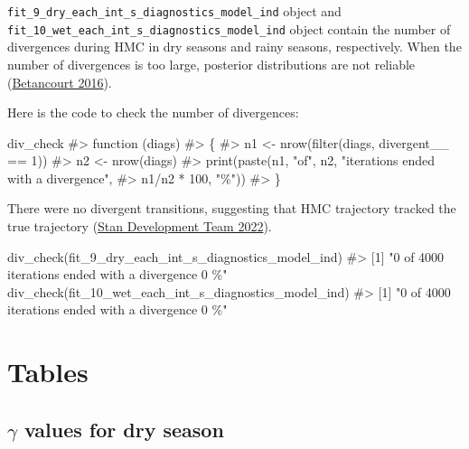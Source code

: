 \documentclass[
  11pt,
  letterpaper,
  DIV=11,
  numbers=noendperiod]{scrartcl}
\newenvironment{Shaded}{}{}
\newcommand{\CommentTok}[1]{\textcolor[rgb]{0.42,0.45,0.49}{#1}}
\newcommand{\FunctionTok}[1]{\textcolor[rgb]{0.44,0.26,0.76}{#1}}
\newcommand{\NormalTok}[1]{\textcolor[rgb]{0.14,0.16,0.18}{#1}}
\begin{document}
\texttt{fit\_9\_dry\_each\_int\_s\_diagnostics\_model\_ind} object and
\texttt{fit\_10\_wet\_each\_int\_s\_diagnostics\_model\_ind} object
contain the number of divergences during HMC in dry seasons and rainy
seasons, respectively. When the number of divergences is too large,
posterior distributions are not reliable
(\protect\hyperlink{ref-Betancourt2016}{Betancourt 2016}).

Here is the code to check the number of divergences:

\begin{Shaded}
\begin{Highlighting}[]
\NormalTok{div\_check}
\CommentTok{\#\textgreater{} function (diags) }
\CommentTok{\#\textgreater{} \{}
\CommentTok{\#\textgreater{}     n1 \textless{}{-} nrow(filter(diags, divergent\_\_ == 1))}
\CommentTok{\#\textgreater{}     n2 \textless{}{-} nrow(diags)}
\CommentTok{\#\textgreater{}     print(paste(n1, "of", n2, "iterations ended with a divergence", }
\CommentTok{\#\textgreater{}         n1/n2 * 100, "\%"))}
\CommentTok{\#\textgreater{} \}}
\end{Highlighting}
\end{Shaded}

There were no divergent transitions, suggesting that HMC trajectory
tracked the true trajectory
(\protect\hyperlink{ref-StanDevelopmentTeam2022}{Stan Development Team
2022}).

\begin{Shaded}
\begin{Highlighting}[]
\FunctionTok{div\_check}\NormalTok{(fit\_9\_dry\_each\_int\_s\_diagnostics\_model\_ind)}
\CommentTok{\#\textgreater{} [1] "0 of 4000 iterations ended with a divergence 0 \%"}
\FunctionTok{div\_check}\NormalTok{(fit\_10\_wet\_each\_int\_s\_diagnostics\_model\_ind)}
\CommentTok{\#\textgreater{} [1] "0 of 4000 iterations ended with a divergence 0 \%"}
\end{Highlighting}
\end{Shaded}

\hypertarget{tables}{%
\section{Tables}\label{tables}}

\hypertarget{gamma-values-for-dry-season}{%
\subsection{\texorpdfstring{\(\gamma\) values for dry
season}{\textbackslash gamma values for dry season}}\label{gamma-values-for-dry-season}}
\end{document}
